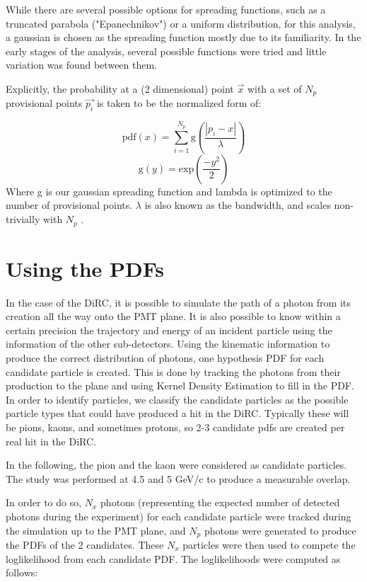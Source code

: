 \documentclass[11pt]{article}
\begin{document}
While there are several possible options for spreading functions, such as a truncated parabola ("Epanechnikov") or a uniform distribution, for this analysis, a gaussian is chosen as the spreading function mostly due to its familiarity.  In the early stages of the analysis, several possible functions were tried and little variation was found between them.  

Explicitly, the probability at a (2 dimensional) point $\vec{x}$ with a set of $N_p$ provisional points $\vec{p_i}$ is taken to be the normalized form of:

\begin{equation}
\textrm{pdf}(x) = \sum\limits_{i=1}^{N_p} \textrm{g}(\frac{|p_i-x|}{\lambda})
\end{equation}
\begin{equation}
\textrm{g}(y) = \textrm{exp}(\frac{-y^2}{2})
\end{equation}
Where g is our gaussian spreading function and lambda is optimized to the number of provisional points.  $\lambda$ is also known as the bandwidth, and scales non-trivially with $N_p$ \cite{SJOS:SJOS445}.

\section{Using the PDFs}
In the case of the DiRC, it is possible to simulate the path of a photon from its creation all the way onto the PMT plane. It is also possible to know within a certain precision the trajectory and energy of an incident particle using the information of the other sub-detectors.  Using the kinematic information to produce the correct distribution of photons, one hypothesis PDF for each candidate particle is created.  This is done by tracking the photons from their production to the plane and using Kernel Density Estimation to fill in the PDF.  In order to identify particles, we classify the candidate particles as the possible particle types that could have produced a hit in the DiRC.  Typically these will be pions, kaons, and sometimes protons, so 2-3 candidate pdfs are created per real hit in the DiRC.

In the following, the pion and the kaon were considered as candidate particles. The study was performed at 4.5 and 5 GeV/c to produce a measurable overlap.  

In order to do so, $N_x$ photons (representing the expected number of detected photons during the experiment) for each candidate particle were tracked during the simulation up to the PMT plane, and $N_p$ photons were generated to produce the PDFs of the 2 candidates.  These $N_x$ particles were then used to compete the loglikelihood from each candidate PDF.  The loglikelihoods were computed as follows:
\end{document}

